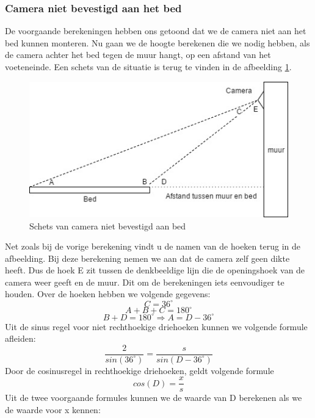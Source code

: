 \subsubsection{Camera niet bevestigd aan het bed}
De voorgaande berekeningen hebben ons getoond dat we de camera niet aan het bed kunnen monteren. Nu gaan we de hoogte berekenen die we nodig hebben, als de camera achter het bed tegen de muur hangt, op een afstand van het voeteneinde. Een schets van de situatie is terug te vinden in de afbeelding \ref{imgCNB}. 
\begin{figure}[hbp]
	\includegraphics[scale=0.7]{CameraNietAanBed}
	\caption{Schets van camera niet bevestigd aan bed}
	\label{imgCNB}
\end{figure}
Net zoals bij de vorige berekening vindt u de namen van de hoeken terug in de afbeelding. Bij deze berekening nemen we aan dat de camera zelf geen dikte heeft. Dus de hoek E zit tussen de denkbeeldige lijn die de openingshoek van de camera weer geeft en de muur. Dit om de berekeningen iets eenvoudiger te houden. 
Over de hoeken hebben we volgende gegevens:
\begin{displaymath}
C=36^\circ
\end{displaymath}
\begin{displaymath}
A+B+C = 180^\circ
\end{displaymath}
\begin{displaymath}
B + D = 180^\circ \Rightarrow A = D-36^\circ
\end{displaymath}
Uit de sinus regel voor niet rechthoekige driehoeken kunnen we volgende formule afleiden:
\begin{displaymath}
\frac{2}{sin(36^\circ)}=\frac{s}{sin(D-36^\circ)}
\end{displaymath}
Door de cosinusregel in rechthoekige driehoeken, geldt volgende formule
\begin{displaymath}
cos(D)=\frac{x}{s}
\end{displaymath}
Uit de twee voorgaande formules kunnen we de waarde van D berekenen als we de waarde voor x kennen:
